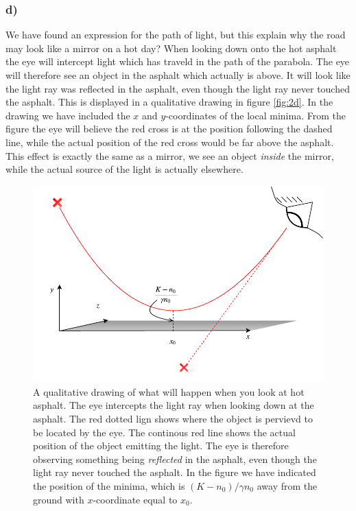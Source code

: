 \documentclass[12pt,twoside]{article}
\begin{document}
\subsubsection*{d)}
We have found an expression for the path of light, but this explain why the road may look like a mirror on a hot day? When looking down onto the hot asphalt the eye will intercept light which has traveld in the path of the parabola. The eye will therefore see an object in the asphalt which actually is above. It will look like the light ray was reflected in the asphalt, even though the light ray never touched the asphalt. This is displayed in a qualitative drawing in figure \vref{fig:2d}. In the drawing we have included the $x$ and $y$-coordinates of the local minima. From the figure the eye will believe the red cross is at the position following the dashed line, while the actual position of the red cross would be far above the asphalt. This effect is exactly the same as a mirror, we see an object \textit{inside} the mirror, while the actual source of the light is actually elsewhere.\par
\begin{figure}
  \centering
  \includegraphics[width=\textwidth]{../figures/drawing.pdf}
  \caption{A qualitative drawing of what will happen when you look at hot asphalt. The eye intercepts the light ray when looking down at the asphalt. The red dotted lign shows where the object is pervievd to be located by the eye. The continous red line shows the actual position of the object emitting the light. The eye is therefore observing something being \textit{reflected} in the asphalt, even though the light ray never touched the asphalt. In the figure we have indicated the position of the minima, which is $(K-n_0)/\gamma n_0$ away from the ground with $x$-coordinate equal to $x_0$.}
  \label{fig:2d}
\end{figure}
\end{document}
